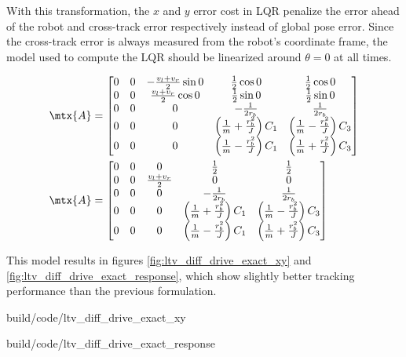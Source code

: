 With this transformation, the $x$ and $y$ error cost in LQR penalize the error
ahead of the robot and cross-track error respectively instead of global pose
error. Since the cross-track error is always measured from the robot's
coordinate frame, the \gls{model} used to compute the LQR should be linearized
around $\theta = 0$ at all times.

\begin{align*}
  \mtx{A} &=
  \begin{bmatrix}
    0 & 0 & -\frac{v_l + v_r}{2}\sin 0 & \frac{1}{2}\cos 0 &
      \frac{1}{2}\cos 0 \\
    0 & 0 & \frac{v_l + v_r}{2}\cos 0 & \frac{1}{2}\sin 0 &
      \frac{1}{2}\sin 0 \\
    0 & 0 & 0 & -\frac{1}{2r_b} & \frac{1}{2r_b} \\
    0 & 0 & 0 & \left(\frac{1}{m} + \frac{r_b^2}{J}\right) C_1 &
      \left(\frac{1}{m} - \frac{r_b^2}{J}\right) C_3 \\
    0 & 0 & 0 & \left(\frac{1}{m} - \frac{r_b^2}{J}\right) C_1 &
      \left(\frac{1}{m} + \frac{r_b^2}{J}\right) C_3
  \end{bmatrix} \\
  \mtx{A} &=
  \begin{bmatrix}
    0 & 0 & 0 & \frac{1}{2} & \frac{1}{2} \\
    0 & 0 & \frac{v_l + v_r}{2} & 0 & 0 \\
    0 & 0 & 0 & -\frac{1}{2r_b} & \frac{1}{2r_b} \\
    0 & 0 & 0 & \left(\frac{1}{m} + \frac{r_b^2}{J}\right) C_1 &
      \left(\frac{1}{m} - \frac{r_b^2}{J}\right) C_3 \\
    0 & 0 & 0 & \left(\frac{1}{m} - \frac{r_b^2}{J}\right) C_1 &
      \left(\frac{1}{m} + \frac{r_b^2}{J}\right) C_3
  \end{bmatrix}
\end{align*}

This \gls{model} results in figures \ref{fig:ltv_diff_drive_exact_xy} and
\ref{fig:ltv_diff_drive_exact_response}, which show slightly better
tracking performance than the previous formulation.

\begin{bookfigure}
  \begin{minisvg}{2}{build/code/ltv_diff_drive_exact_xy}
    \caption{Linear time-varying differential drive controller x-y plot}
    \label{fig:ltv_diff_drive_exact_xy}
  \end{minisvg}
  \hfill
  \begin{minisvg}{2}{build/code/ltv_diff_drive_exact_response}
    \caption{Linear time-varying differential drive controller response}
    \label{fig:ltv_diff_drive_exact_response}
  \end{minisvg}
\end{bookfigure}

